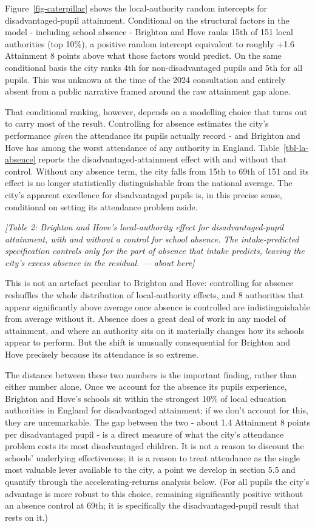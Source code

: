 \documentclass[
  12pt,
  titlepage]{article}
\begin{document}
Figure~\ref{fig-caterpillar} shows the local-authority random intercepts
for disadvantaged-pupil attainment. Conditional on the structural
factors in the model - including school absence - Brighton and Hove
ranks 15th of 151 local authorities (top 10\%), a positive random
intercept equivalent to roughly +1.6 Attainment 8 points above what
those factors would predict. On the same conditional basis the city
ranks 4th for non-disadvantaged pupils and 5th for all pupils. This was
unknown at the time of the 2024 consultation and entirely absent from a
public narrative framed around the raw attainment gap alone.

That conditional ranking, however, depends on a modelling choice that
turns out to carry most of the result. Controlling for absence estimates
the city's performance \emph{given} the attendance its pupils actually
record - and Brighton and Hove has among the worst attendance of any
authority in England. Table~\ref{tbl-la-absence} reports the
disadvantaged-attainment effect with and without that control. Without
any absence term, the city falls from 15th to 69th of 151 and its effect
is no longer statistically distinguishable from the national average.
The city's apparent excellence for disadvantaged pupils is, in this
precise sense, conditional on setting its attendance problem aside.

\emph{{[}Table 2: Brighton and Hove's local-authority effect for
disadvantaged-pupil attainment, with and without a control for school
absence. The intake-predicted specification controls only for the part
of absence that intake predicts, leaving the city's excess absence in
the residual. --- about here{]}}

This is not an artefact peculiar to Brighton and Hove: controlling for
absence reshuffles the whole distribution of local-authority effects,
and 8 authorities that appear significantly above average once absence
is controlled are indistinguishable from average without it. Absence
does a great deal of work in any model of attainment, and where an
authority sits on it materially changes how its schools appear to
perform. But the shift is unusually consequential for Brighton and Hove
precisely because its attendance is so extreme.

The distance between these two numbers is the important finding, rather
than either number alone. Once we account for the absence its pupils
experience, Brighton and Hove's schools sit within the strongest 10\% of
local education authorities in England for disadvantaged attainment; if
we don't account for this, they are unremarkable. The gap between the
two - about 1.4 Attainment 8 points per disadvantaged pupil - is a
direct measure of what the city's attendance problem costs its most
disadvantaged children. It is not a reason to discount the schools'
underlying effectiveness; it is a reason to treat attendance as the
single most valuable lever available to the city, a point we develop in
section 5.5 and quantify through the accelerating-returns analysis
below. (For all pupils the city's advantage is more robust to this
choice, remaining significantly positive without an absence control at
69th; it is specifically the disadvantaged-pupil result that rests on
it.)
\end{document}
